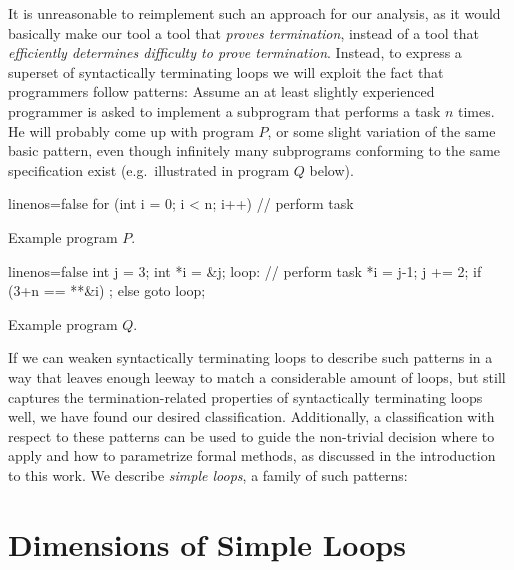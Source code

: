 It is unreasonable to reimplement such an approach for our analysis, as it would basically make our tool \sloopy{} a tool that \emph{proves termination}, instead of a tool that \emph{efficiently determines difficulty to prove termination}. Instead, to express a superset of syntactically terminating loops we will exploit the fact that programmers follow patterns: Assume an at least slightly experienced programmer is asked to implement a subprogram that performs a task $n$ times. He will probably come up with program $P$, or some slight variation of the same basic pattern, even though infinitely many subprograms conforming to the same specification exist (e.g.\ illustrated in program $Q$ below).

\begin{center}
\begin{minipage}{.48\linewidth}
\begin{listing}[H]
\begin{ccode*}{linenos=false}
for (int i = 0; i < n; i++) {
    // perform task
}
\end{ccode*}
\caption{Example program $P$.}
\end{listing}
\end{minipage}
\hfill
\begin{minipage}{.48\linewidth}
\begin{listing}[H]
\begin{ccode*}{linenos=false}
int j = 3;
int *i = &j;
loop:
// perform task
*i = j-1;
j += 2;
if (3+n == **&i) ;
else goto loop;
\end{ccode*}
\caption{Example program $Q$.}
\end{listing}
\end{minipage}
\end{center}

If we can weaken syntactically terminating loops to describe such patterns in a way that leaves enough leeway to match a considerable amount of loops, but still captures the termination-related properties of syntactically terminating loops well, we have found our desired classification. Additionally, a classification with respect to these patterns can be used to guide the non-trivial decision where to apply and how to parametrize formal methods, as discussed in the introduction to this work. We describe \emph{simple loops}, a family of such patterns:

\section{Dimensions of Simple Loops}

